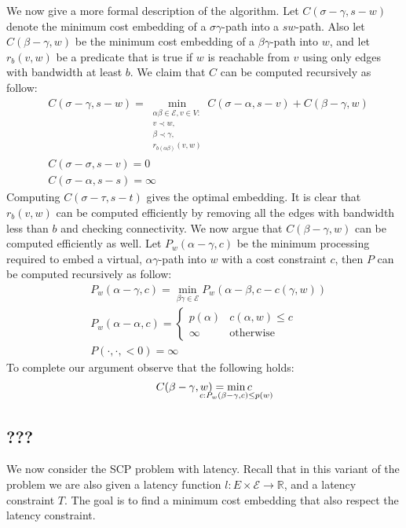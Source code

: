 \documentclass[runningheads]{llncs}
\newcommand{\scp}{\textsc{SCP}\xspace}
\newcommand{\calE}{\mathcal{E}}
\def\R{\mathbb{R}}
\begin{document}
We now give a more formal description of the algorithm.
Let $C(\sigma-\gamma , s-w)$ denote the
minimum cost embedding of a $\sigma\gamma $-path into a $sw$-path.
Also let $C(\beta-\gamma, w)$ be the minimum cost
embedding of a $\beta\gamma$-path into $w$, 
and let $r_b(v, w)$ be a predicate that is true if $w$ is reachable from $v$
using only edges with bandwidth at least $b$. 
We claim that $C$ can be computed recursively as follow:
\begin{align*}
&C(\sigma-\gamma , s-w) = 
\min_{\substack{
\alpha\beta \in \calE,  
v \in V:
\\
v \prec w,
\\
\beta \prec \gamma, 
\\
r_{b(\alpha\beta)}(v,w)
}}
C(\sigma-\alpha , s-v)
+
C(\beta-\gamma, w)
\\
&C(\sigma-\sigma , s-v) = 0
\\
&C(\sigma-\alpha , s-s) = \infty
\end{align*}
Computing $C(\sigma-\tau , s-t)$ gives the optimal embedding. 
It is clear that $r_b(v,w)$ can be computed efficiently by removing all the edges
with bandwidth less than $b$ and checking connectivity.
We now argue that $C(\beta-\gamma, w)$ can be computed efficiently as well.
Let $P_w(\alpha-\gamma, c)$ 
be the minimum processing required to embed a virtual, 
$\alpha\gamma$-path into $w$ with a cost constraint $c$, 
then $P$ can be computed recursively as follow:
\begin{align*}
&P_{w}(\alpha-\gamma, c) = 
\min_{\beta\gamma  \in \calE} P_{w}(\alpha-\beta, c - c(\gamma, w))
\\
&P_w(\alpha-\alpha, c) = 
\begin{cases}
p(\alpha) & c(\alpha, w) \leq c
\\
\infty & \text{otherwise}
\end{cases}
\\
&P(\cdot, \cdot, <0) = \infty
\end{align*}
To complete our argument observe that the following holds:
$$C(\beta-\gamma, w) = \smashoperator{\min_{c : P_w(\beta-\gamma, c) \leq p(w)}}c$$ 


\subsection{???}

We now consider the \scp{} problem with latency.
Recall that in this variant of the problem we are also given a latency function
$l : E \times \calE \to \R$, and a latency constraint $T$.
The goal is to find a minimum cost embedding that also respect the latency
constraint.
\end{document}
